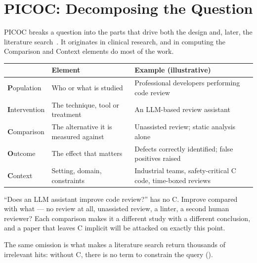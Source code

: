 \section{PICOC: Decomposing the Question}

PICOC breaks a question into the parts that drive both the design and, later,
the literature search~\cite{petticrew2006systematic}. It originates in clinical
research, and in computing the Comparison and Context elements do most of the
work.

\begin{center}
\small
\begin{tabular}{@{}L{2.4cm}L{4.4cm}L{7.1cm}@{}}
\toprule
 & \textbf{Element} & \textbf{Example (illustrative)} \\
\midrule
\textbf{P}opulation  & Who or what is studied
                     & Professional developers performing code review \\
\textbf{I}ntervention& The technique, tool or treatment
                     & An LLM-based review assistant \\
\textbf{C}omparison  & The alternative it is measured against
                     & Unassisted review; static analysis alone \\
\textbf{O}utcome     & The effect that matters
                     & Defects correctly identified; false positives raised \\
\textbf{C}ontext     & Setting, domain, constraints
                     & Industrial teams, safety-critical C code, time-boxed
                       reviews \\
\bottomrule
\end{tabular}
\end{center}

\begin{conceptbox}
``Does an LLM assistant improve code review?'' has no C. Improve compared with
what --- no review at all, unassisted review, a linter, a second human
reviewer? Each comparison makes it a different study with a different
conclusion, and a paper that leaves C implicit will be attacked on exactly this
point.

\medskip
The same omission is what makes a literature search return thousands of
irrelevant hits: without C, there is no term to constrain the query
().
\end{conceptbox}

